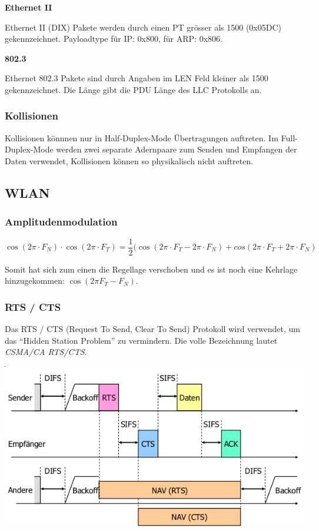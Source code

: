 \textbf{Ethernet II}

Ethernet II (DIX) Pakete werden durch einen PT grösser als 1500
(0x05DC) gekennzeichnet. Payloadtype für IP: 0x800, für ARP: 0x806.

\textbf{802.3}

Ethernet 802.3 Pakete sind durch Angaben im LEN Feld kleiner als 1500
gekennzeichnet. Die Länge gibt die PDU Länge des LLC Protokolls an.


\subsubsection{Kollisionen}

Kollisionen könnnen nur in Half-Duplex-Mode Übertragungen auftreten. Im
Full-Duplex-Mode werden zwei separate Adernpaare zum Senden und Empfangen der
Daten verwendet, Kollisionen können so physikalisch nicht auftreten.


\subsection{WLAN}

\subsubsection{Amplitudenmodulation}

\[
	\cos (2\pi \cdot F_N) \cdot \cos (2\pi \cdot F_T)
	= \frac{1}{2}(\cos (2\pi \cdot F_T - 2\pi \cdot F_N)
	+ cos(2\pi \cdot F_T + 2\pi \cdot F_N)
\]

Somit hat sich zum einen die Regellage verschoben und es ist noch eine Kehrlage
hinzugekommen: $\cos (2\pi F_T - F_N)$.

\subsubsection{RTS / CTS}

Das RTS / CTS (Request To Send, Clear To Send) Protokoll wird verwendet, um das
``Hidden Station Problem'' zu vermindern. Die volle Bezeichnung lautet
\textit{CSMA/CA RTS/CTS}.

\begin{center}
	\includegraphics[width=.8\textwidth]{media/rts_cts.png}
\end{center}

